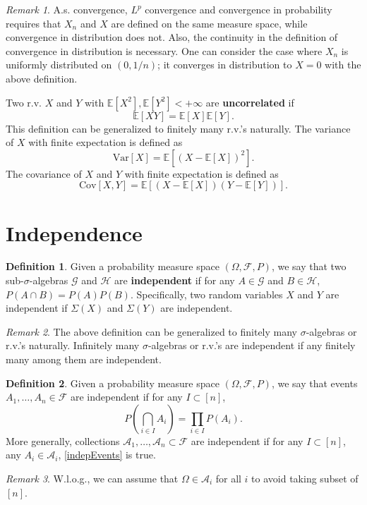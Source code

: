 \documentclass[openany]{book}
\theoremstyle{definition}
\newtheorem{definition}{Definition}[chapter]
\theoremstyle{remark}
\newtheorem*{remark}{Remark}
\begin{document}
\begin{remark}
    A.s. convergence, $L^p$ convergence and convergence in probability requires that $X_n$ and $X$ are defined on the same measure space, while convergence in distribution does not. Also, the continuity in the definition of convergence in distribution is necessary. One can consider the case where $X_n$ is uniformly distributed on $(0,1/n)$; it converges in distribution to $X=0$ with the above definition.
\end{remark}

Two r.v. $X$ and $Y$ with $\mathbb{E}[X^2],\mathbb{E}[Y^2]<+\infty$ are \textbf{uncorrelated} if
\begin{equation*}
    \mathbb{E}[XY]=\mathbb{E}[X]\mathbb{E}[Y].
\end{equation*}
This definition can be generalized to finitely many r.v.'s naturally. The variance of $X$ with finite expectation is defined as
\begin{equation*}
    \mathrm{Var}[X]=\mathbb{E}[(X-\mathbb{E}[X])^2].
\end{equation*}
The covariance of $X$ and $Y$ with finite expectation is defined as
\begin{equation*}
    \mathrm{Cov}[X,Y]=\mathbb{E}[(X-\mathbb{E}[X])(Y-\mathbb{E}[Y])].
\end{equation*}

\section{Independence}
\begin{definition}
    Given a probability measure space $(\Omega,\mathcal{F},P)$, we say that two sub-$\sigma$-algebras $\mathcal{G}$ and $\mathcal{H}$ are \textbf{independent} if for any $A\in \mathcal{G}$ and $B\in \mathcal{H}$, $P(A\cap B)=P(A)P(B)$. Specifically, two random variables $X$ and $Y$ are independent if $\Sigma(X)$ and $\Sigma(Y)$ are independent.
\end{definition}
\begin{remark}
    The above definition can be generalized to finitely many $\sigma$-algebras or r.v.'s naturally. Infinitely many $\sigma$-algebras or r.v.'s are independent if any finitely many among them are independent.
\end{remark}
\begin{definition}
    Given a probability measure space $(\Omega,\mathcal{F},P)$, we say that events $A_1,\ldots,A_n\in \mathcal{F}$ are independent if for any $I\subset[n]$,
    \begin{equation}\label{indepEvents}
        P\left(\bigcap_{i\in I}A_i\right)=\prod_{i\in I}P(A_i).
    \end{equation}
    More generally, collections $\mathcal{A}_1,\ldots,\mathcal{A}_n\subset \mathcal{F}$ are independent if for any $I\subset[n]$, any $A_i\in \mathcal{A}_i$, \eqref{indepEvents} is true.
\end{definition}
\begin{remark}
    W.l.o.g., we can assume that $\Omega\in \mathcal{A}_i$ for all $i$ to avoid taking subset of $[n]$.
\end{remark}
\end{document}
